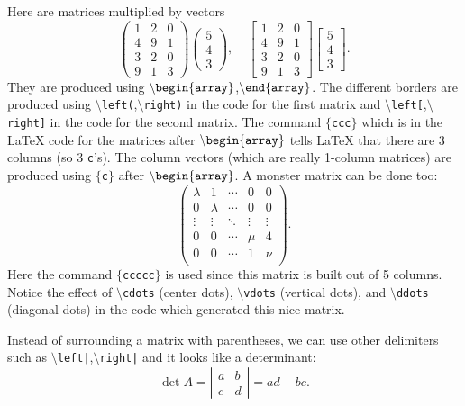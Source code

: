 \documentclass[12pt,letterpaper]{amsart}
\newcommand{\sm}{\setminus}
\newcommand{\pln}[1]{$\sm${\tt #1}}
\newcommand{\bgn}[1]{$\tt {\sm}begin\{#1\}$}
\newcommand{\nd}[1]{$\tt {\sm}end\{#1\}$}
\theoremstyle{plain}
\theoremstyle{definition}
\numberwithin{equation}{section}
\begin{document}
Here are matrices multiplied by vectors
$$
\left(
\begin{array}{ccc}
1 & 2 & 0 \\
4 & 9 & 1 \\
3 & 2 & 0 \\
9 & 1 & 3 
\end{array}
\right)
\left(
\begin{array}{c}
5 \\ 4 \\ 3 
\end{array}
\right), 
\ \ \ \ \ 
\left[
\begin{array}{ccc}
1 & 2 & 0 \\
4 & 9 & 1 \\
3 & 2 & 0 \\
9 & 1 & 3 
\end{array}
\right]
\left[
\begin{array}{c}
5 \\ 4 \\ 3 
\end{array}
\right].
$$
They are produced using 
\bgn{array},\nd{array}.
The different borders are produced using 
\pln{left(},\pln{right)} in the code for the first matrix and 
\pln{left[},\pln{right]} in the code for the second matrix. 
The command {\tt $\{$ccc$\}$}
which is in the LaTeX 
code for the matrices after \bgn{array}
tells LaTeX that there are 3 columns (so 3 {\tt c}'s). 
The column vectors (which are really 1-column matrices) 
are produced using {\tt $\{$c$\}$} after 
\bgn{array}.
A monster matrix can be done too:
$$
\left(
\begin{array}{ccccc}
\lambda & 1 & \cdots & 0 & 0 \\
0 & \lambda & \cdots & 0 & 0 \\
\vdots & \vdots & \ddots & \vdots & \vdots\\
0 & 0 & \cdots & \mu & 4 \\
0 & 0 & \cdots & 1 & \nu \\
\end{array}
\right).
$$
Here the command 
{\tt $\{$ccccc$\}$} is used since this matrix is built out of 
5 columns.
Notice the effect of \pln{cdots} (center dots), 
\pln{vdots} (vertical dots), and \pln{ddots} (diagonal dots) 
in the code which generated this nice matrix. 

Instead of surrounding a matrix with parentheses, we can 
use other delimiters such as 
\pln{left|},\pln{right|} and it looks like a determinant: 
$$
\det A = 
\left|
\begin{array}{cc}
a & b \\
c & d 
\end{array}
\right| = ad - bc.
$$
\end{document}
